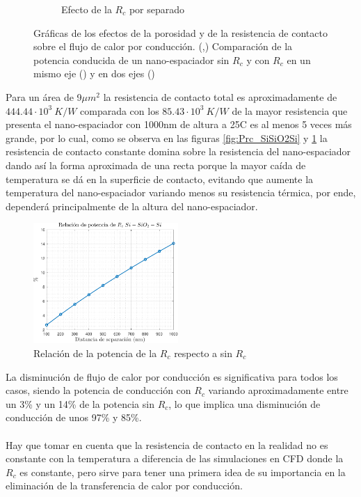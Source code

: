 \begin{figure}[H]
\begin{subfigure}[b]{0.49\textwidth}
		\caption{Efecto de la $R_c$ por separado}
		\label{fig:Prc2_SiSiO2Si}
	\end{subfigure}
	\caption[Efectos de la resistencia de contacto sobre el flujo de calor por conducción]{Gráficas de los efectos de la porosidad y de la resistencia de contacto sobre el flujo de calor por conducción. (,) Comparación de la potencia conducida de un nano-espaciador sin $R_c$ y con $R_c$ en un mismo eje () y en dos ejes ()}
	\label{fig:PcondRc_SiSiO2Si}
\end{figure}
Para un área de 9$\mu m^2$ la resistencia de contacto total es aproximadamente de $444.44\cdot 10^3 \ K/W$ comparada con los $85.43\cdot 10^3 \ K/W$ de la mayor resistencia que presenta el nano-espaciador con 1000nm de altura a 25\textdegree C es al menos 5 veces más grande, por lo cual, como se observa en las figuras \ref{fig:Prc_SiSiO2Si} y \ref{fig:Prc2_SiSiO2Si} la resistencia de contacto constante domina sobre la resistencia del nano-espaciador dando así la forma aproximada de una recta porque la mayor caída de temperatura se dá en la superficie de contacto, evitando que aumente la temperatura del nano-espaciador variando menos su resistencia térmica, por ende, dependerá principalmente de la altura del nano-espaciador.
\begin{figure}[H]
	\centering
		\includegraphics[width=0.49\textwidth]{figuras/Resultados/conduccion/pdf/relPrc_SiSiO2Si.pdf}
		\caption{Relación de la potencia de la $R_c$ respecto a sin $R_c$}
	\label{fig:relPrc_SiSiO2Si}
\end{figure}
La disminución de flujo de calor por conducción es significativa para todos los casos, siendo la potencia de conducción con $R_c$ variando aproximadamente entre un 3\% y un 14\% de la potencia sin $R_c$, lo que implica una disminución de conducción de unos 97\% y 85\%.\\\\
Hay que tomar en cuenta que la resistencia de contacto en la realidad no es constante con la temperatura a diferencia de las simulaciones en CFD donde la $R_c$ es constante, pero sirve para tener una primera idea de su importancia en la eliminación de la transferencia de calor por conducción.
